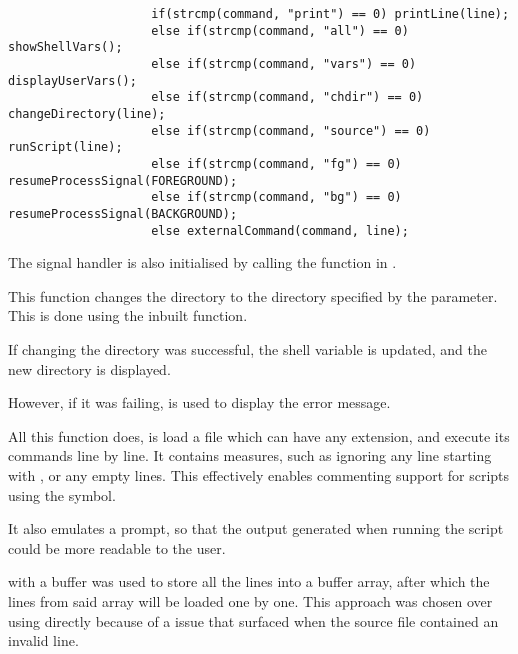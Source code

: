 \documentclass[12pt, a4paper]{report}
\begin{document}
                \begingroup
                \fontsize{10pt}{10pt}\selectfont
                \begin{verbatim}
                    if(strcmp(command, "print") == 0) printLine(line);
                    else if(strcmp(command, "all") == 0) showShellVars();
                    else if(strcmp(command, "vars") == 0) displayUserVars();
                    else if(strcmp(command, "chdir") == 0) changeDirectory(line); 
                    else if(strcmp(command, "source") == 0) runScript(line);
                    else if(strcmp(command, "fg") == 0) resumeProcessSignal(FOREGROUND);
                    else if(strcmp(command, "bg") == 0) resumeProcessSignal(BACKGROUND);
                    else externalCommand(command, line);
                \end{verbatim}
                \endgroup

                The signal handler is also initialised by calling the 
                function in .

                \clearpage
            
                This function changes the directory to the directory specified by
                the parameter. This is done using the inbuilt  function.

                If changing the directory was successful, the  shell
                variable is updated, and the new directory is displayed.

                However, if it was failing,  is used to display the
                error message.
            
                All this function does, is load a  file which can have
                any extension, and execute its commands line by line. It contains
                measures, such as ignoring any line starting with \tx{\#}, or 
                any empty lines. This effectively enables commenting support for 
                scripts using the \tx{\#} symbol.

                It also emulates a prompt, so that the output generated when running 
                the script could be more readable to the user.

                  with a buffer was used to 
                store all the lines into a buffer array, after which the lines from
                said array will be loaded one by one. This approach was chosen over
                using  directly because of a  issue that 
                surfaced when the source file contained an invalid line.
\end{document}
